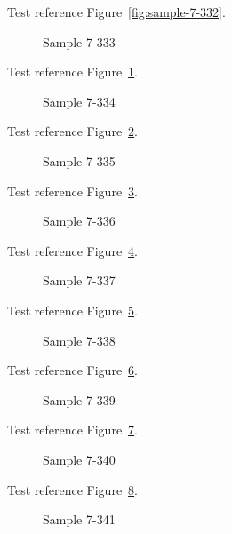 Test reference Figure~\ref{fig:sample-7-332}.

\begin{figure}[tbhp]
\caption{Sample 7-333}
\label{fig:sample-7-333}
\end{figure}

Test reference Figure~\ref{fig:sample-7-333}.

\begin{figure}[tbhp]
\caption{Sample 7-334}
\label{fig:sample-7-334}
\end{figure}

Test reference Figure~\ref{fig:sample-7-334}.

\begin{figure}[tbhp]
\caption{Sample 7-335}
\label{fig:sample-7-335}
\end{figure}

Test reference Figure~\ref{fig:sample-7-335}.

\begin{figure}[tbhp]
\caption{Sample 7-336}
\label{fig:sample-7-336}
\end{figure}

Test reference Figure~\ref{fig:sample-7-336}.

\begin{figure}[tbhp]
\caption{Sample 7-337}
\label{fig:sample-7-337}
\end{figure}

Test reference Figure~\ref{fig:sample-7-337}.

\begin{figure}[tbhp]
\caption{Sample 7-338}
\label{fig:sample-7-338}
\end{figure}

Test reference Figure~\ref{fig:sample-7-338}.

\begin{figure}[tbhp]
\caption{Sample 7-339}
\label{fig:sample-7-339}
\end{figure}

Test reference Figure~\ref{fig:sample-7-339}.

\begin{figure}[tbhp]
\caption{Sample 7-340}
\label{fig:sample-7-340}
\end{figure}

Test reference Figure~\ref{fig:sample-7-340}.

\begin{figure}[tbhp]
\caption{Sample 7-341}
\label{fig:sample-7-341}
\end{figure}


